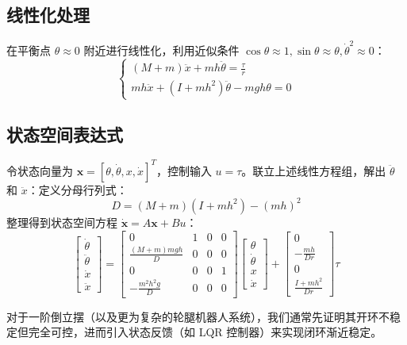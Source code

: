 \subsection{线性化处理}
在平衡点 $\theta \approx 0$ 附近进行线性化，利用近似条件 $\cos\theta \approx 1, 
\sin\theta \approx \theta, \dot{\theta}^2 \approx 0$：
\begin{equation}
\begin{cases}
(M + m)\ddot{x} + mh\ddot{\theta} = \frac{\tau}{r} \\
mh\ddot{x} + (I + mh^2)\ddot{\theta} - mgh\theta = 0
\end{cases}
\end{equation}

\subsection{状态空间表达式}
令状态向量为 $\mathbf{x} = [\theta, \dot{\theta}, x, \dot{x}]^T$，控制输入 $u = \tau$。联立上述线性方程组，解出 $\ddot{\theta}$ 和 $\ddot{x}$：定义分母行列式：$$D = (M+m)(I+mh^2) - (mh)^2$$整理得到状态空间方程 $\dot{\mathbf{x}} = A\mathbf{x} + Bu$：
\begin{equation}
\begin{bmatrix}
\dot{\theta} \\
\ddot{\theta} \\
\dot{x} \\
\ddot{x}
\end{bmatrix}
=
\begin{bmatrix}
0 & 1 & 0 & 0 \\
\frac{(M+m)mgh}{D} & 0 & 0 & 0 \\
0 & 0 & 0 & 1 \\
-\frac{m^2h^2g}{D} & 0 & 0 & 0
\end{bmatrix}
\begin{bmatrix}
\theta \\
\dot{\theta} \\
x \\
\dot{x}
\end{bmatrix}
+
\begin{bmatrix}
0 \\
-\frac{mh}{Dr} \\
0 \\
\frac{I+mh^2}{Dr}
\end{bmatrix}
\tau
\end{equation}

对于一阶倒立摆（以及更为复杂的轮腿机器人系统），我们通常先证明其开环不稳定但完全可控，进而引入状态反馈（如 LQR 控制器）来实现闭环渐近稳定。

